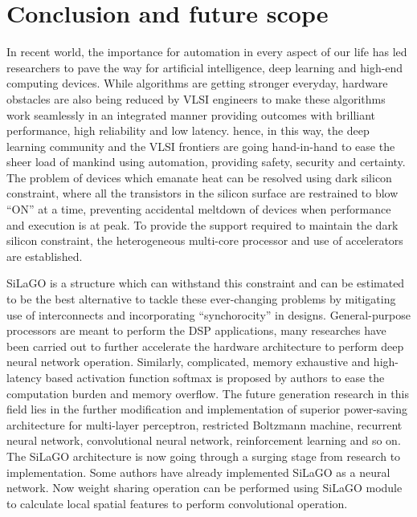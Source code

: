 \documentclass[journal]{IEEEtran}
\begin{document}
\section{Conclusion and future scope}
In recent world, the importance for automation in every aspect of our life has led researchers to pave the way for artificial intelligence, deep learning and high-end computing devices. While algorithms are getting stronger everyday, hardware obstacles are also being reduced by VLSI engineers to make these algorithms work seamlessly in an integrated manner providing outcomes with brilliant performance, high reliability and low latency. hence, in this way, the deep learning community and the VLSI frontiers are going hand-in-hand to ease the sheer load of mankind using automation, providing safety, security and certainty. The problem of devices which emanate heat can be resolved using dark silicon constraint, where all the transistors in the silicon surface are restrained to blow ``ON'' at a time, preventing accidental meltdown of devices when performance and execution is at peak. To provide the support required to maintain the dark silicon constraint, the heterogeneous multi-core processor and use of accelerators are established.
\par SiLaGO is a structure which can withstand this constraint and can be estimated to be the best alternative to tackle these ever-changing problems by mitigating use of interconnects and incorporating ``synchorocity'' in designs. General-purpose processors are meant to perform the DSP applications, many researches have been carried out to further accelerate the hardware architecture to perform deep neural network operation. Similarly, complicated, memory exhaustive and high-latency based activation function softmax is proposed by authors to ease the computation burden and memory overflow. The future generation research in this field lies in the further modification and implementation of superior power-saving architecture for multi-layer perceptron, restricted Boltzmann machine, recurrent neural network, convolutional neural network, reinforcement learning and so on. The SiLaGO architecture is now going through a surging stage from research to implementation. Some authors have already implemented SiLaGO as a neural network. Now weight sharing operation can be performed using SiLaGO module to calculate local spatial features to perform convolutional operation.
\end{document}
